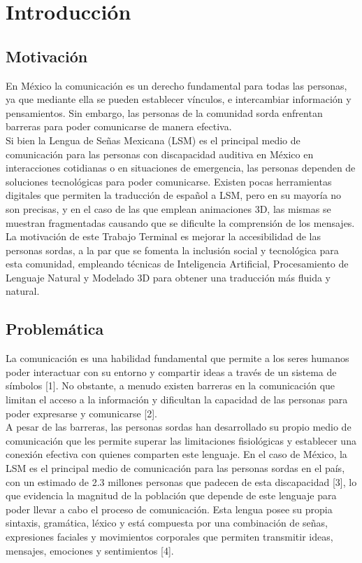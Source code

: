 \chapter{Introducción}
\section{Motivación}
En México la comunicación es un derecho fundamental para todas las personas, ya que mediante ella se pueden establecer vínculos, e intercambiar información y pensamientos. Sin embargo, las personas de la comunidad sorda enfrentan barreras para poder comunicarse de manera efectiva. \\

Si bien la Lengua de Señas Mexicana (LSM) es el principal medio de comunicación para las personas con discapacidad auditiva en México en interacciones cotidianas o en situaciones de emergencia, las personas dependen de soluciones tecnológicas para poder comunicarse. Existen pocas herramientas digitales que permiten la traducción de español a LSM, pero en su mayoría no son precisas, y en el caso de las que emplean animaciones 3D, las mismas se muestran fragmentadas causando que se dificulte la comprensión de los mensajes.\\

La motivación de este Trabajo Terminal es mejorar la accesibilidad de las personas sordas, a la par que se fomenta la inclusión social y tecnológica para esta comunidad, empleando técnicas de Inteligencia Artificial, Procesamiento de Lenguaje Natural y Modelado 3D para obtener una traducción más fluida y natural.\\

\section{Problemática}
La comunicación es una habilidad fundamental que permite a los seres humanos poder interactuar con su entorno y compartir ideas a través de un sistema de símbolos [1]. No obstante, a menudo existen barreras en la comunicación que limitan el acceso a la información y dificultan la capacidad de las personas para poder expresarse y comunicarse [2]. \\

A pesar de las barreras, las personas sordas han desarrollado su propio medio de comunicación que les permite superar las limitaciones fisiológicas y establecer una conexión efectiva con quienes comparten este lenguaje. En el caso de México, la LSM es el principal medio de comunicación para las personas sordas en el país, con un estimado de 2.3 millones personas que padecen de esta discapacidad [3], lo que evidencia la magnitud de la población que depende de este lenguaje para poder llevar a cabo el proceso de comunicación. Esta lengua posee su propia sintaxis, gramática, léxico y está compuesta por una combinación de señas, expresiones faciales y movimientos corporales que permiten transmitir ideas, mensajes, emociones y sentimientos [4].\\

